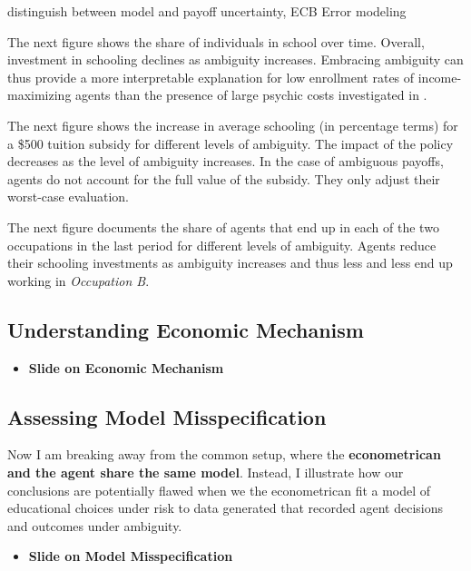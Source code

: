 \citet{Hansen.2001} distinguish between model and payoff uncertainty, ECB Error modeling

The next figure shows the share of individuals in school over time. Overall, investment in schooling declines as ambiguity increases. Embracing ambiguity can thus provide a more interpretable explanation for low enrollment rates of income-maximizing agents than the presence of large psychic costs investigated in \citet{Eisenhauer.2015b}.

The next figure shows the increase in average schooling (in percentage terms) for a \$500 tuition subsidy for different levels of ambiguity. The impact of the policy decreases as the level of ambiguity increases. In the case of ambiguous payoffs, agents do not account for the full value of the subsidy. They only adjust their worst-case evaluation.


The next figure documents the share of agents that end up in each of the two occupations in the last period for different levels of ambiguity. Agents reduce their schooling investments as ambiguity increases and thus less and less end up working in \textit{Occupation B}. 
\subsection{Understanding Economic Mechanism}
\begin{itemize}\item[] \textbf{Slide on Economic Mechanism}\end{itemize}



\subsection{Assessing Model Misspecification}
Now I am breaking away from the common setup, where the \textbf{econometrican and the agent share the same model}. Instead, I illustrate how our conclusions are potentially flawed when we the econometrican fit a model of educational choices under risk to data generated that recorded agent decisions and outcomes under ambiguity.
\begin{itemize}\item[] \textbf{Slide on Model Misspecification}\end{itemize}
